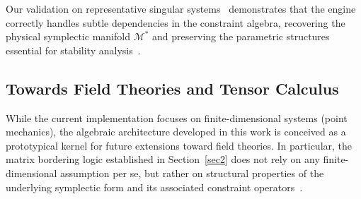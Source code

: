 \documentclass[11pt,a4paper]{article}
\begin{document}
Our validation on representative singular systems~\cite{HojmanUrrutia1981,Brown2023} demonstrates that the engine correctly handles subtle dependencies in the constraint algebra, recovering the physical symplectic manifold $\mathcal{M}^*$ and preserving the parametric structures essential for stability analysis~\cite{Kuznetsov2004,Guckenheimer1983}.






\subsection*{Towards Field Theories and Tensor Calculus}


While the current implementation focuses on finite-dimensional systems (point mechanics), the algebraic architecture developed in this work is conceived as a prototypical kernel for future extensions toward field theories. In particular, the matrix bordering logic established in Section~\ref{sec2} does not rely on any finite-dimensional assumption per se, but rather on structural properties of the underlying symplectic form and its associated constraint operators~\cite{ArnoldBook,Marsden1999}.
\end{document}
